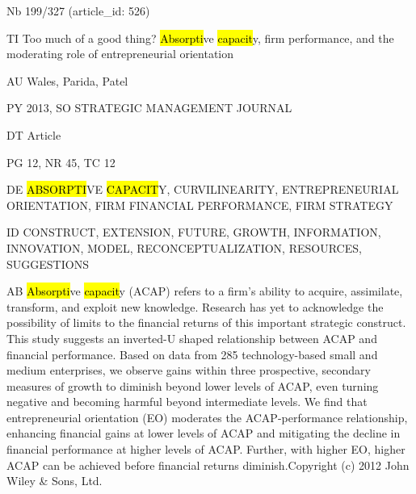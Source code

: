 \documentclass[a4paper]{article}
\begin{document}
\vspace*{-2cm}
Nb \tabto{0cm}199/327 (article\_id: 526)\par
TI \tabto{0cm}Too much of a good thing? \hl{Absorpti}ve \hl{capacit}y, firm performance, and the moderating role of entrepreneurial orientation\par
AU \tabto{0cm}Wales, Parida, Patel\par
PY \tabto{0cm}2013, SO STRATEGIC MANAGEMENT JOURNAL\par
DT \tabto{0cm}Article\par
PG \tabto{0cm}12, NR 45, TC 12\par
DE \tabto{0cm}\hl{ABSORPTI}VE \hl{CAPACIT}Y, CURVILINEARITY, ENTREPRENEURIAL ORIENTATION, FIRM FINANCIAL PERFORMANCE, FIRM STRATEGY\par
ID \tabto{0cm}CONSTRUCT, EXTENSION, FUTURE, GROWTH, INFORMATION, INNOVATION, MODEL, RECONCEPTUALIZATION, RESOURCES, SUGGESTIONS\par
AB \tabto{0cm}\hl{Absorpti}ve \hl{capacit}y (ACAP) refers to a firm's ability to acquire, assimilate, transform, and exploit new knowledge. Research has yet to acknowledge the possibility of limits to the financial returns of this important strategic construct. This study suggests an inverted-U shaped relationship between ACAP and financial performance. Based on data from 285 technology-based small and medium enterprises, we observe gains within three prospective, secondary measures of growth to diminish beyond lower levels of ACAP, even turning negative and becoming harmful beyond intermediate levels. We find that entrepreneurial orientation (EO) moderates the ACAP-performance relationship, enhancing financial gains at lower levels of ACAP and mitigating the decline in financial performance at higher levels of ACAP. Further, with higher EO, higher ACAP can be achieved before financial returns diminish.Copyright (c) 2012 John Wiley \& Sons, Ltd.\par
\clearpage
\end{document}
